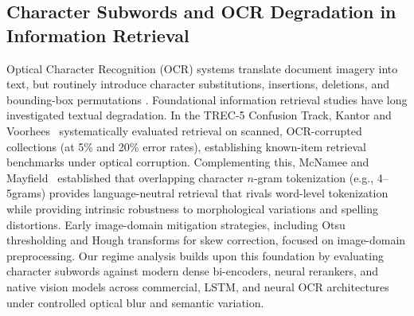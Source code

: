 \subsection{Character Subwords and OCR Degradation in Information Retrieval}
Optical Character Recognition (OCR) systems translate document imagery into text, but routinely introduce character substitutions, insertions, deletions, and bounding-box permutations \cite{smith2007tesseract, fateh2024ocr}. Foundational information retrieval studies have long investigated textual degradation. In the TREC-5 Confusion Track, Kantor and Voorhees~\cite{kantor2000confusion} systematically evaluated retrieval on scanned, OCR-corrupted collections (at 5\% and 20\% error rates), establishing known-item retrieval benchmarks under optical corruption. Complementing this, McNamee and Mayfield~\cite{mcnamee2004character} established that overlapping character $n$-gram tokenization (e.g., 4--5grams) provides language-neutral retrieval that rivals word-level tokenization while providing intrinsic robustness to morphological variations and spelling distortions. Early image-domain mitigation strategies, including Otsu thresholding \cite{otsu1979} and Hough transforms \cite{hough1962} for skew correction, focused on image-domain preprocessing. Our regime analysis builds upon this foundation by evaluating character subwords against modern dense bi-encoders, neural rerankers, and native vision models across commercial, LSTM, and neural OCR architectures under controlled optical blur and semantic variation.


